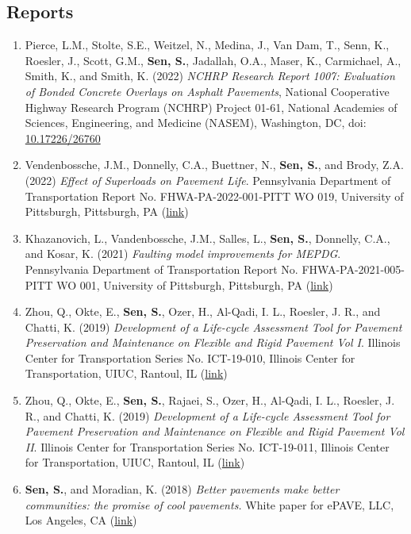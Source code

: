 \documentclass[12pt]{article}
\begin{document}
\subsection*{Reports}
\begin{enumerate}
	\item Pierce, L.M., Stolte, S.E., Weitzel, N., Medina, J., Van Dam, T., Senn, K., Roesler, J., Scott, G.M., \textbf{Sen, S.}, Jadallah, O.A., Maser, K., Carmichael, A., Smith, K., and Smith, K. (2022) \textit{NCHRP Research Report 1007: Evaluation of Bonded Concrete Overlays on Asphalt Pavements}, National Cooperative Highway Research Program (NCHRP) Project 01-61, National Academies of Sciences, Engineering, and Medicine (NASEM), Washington, DC, doi: \href{http://doi.org/10.17226/26760}{10.17226/26760}
	\item Vendenbossche, J.M., Donnelly, C.A., Buettner, N., \textbf{Sen, S.}, and Brody, Z.A. (2022) \textit{Effect of Superloads on Pavement Life}. Pennsylvania Department of Transportation Report No. FHWA-PA-2022-001-PITT WO 019, University of Pittsburgh, Pittsburgh, PA (\href{https://www.penndot.pa.gov/ProjectAndPrograms/Planning/Research-And-Implementation/Documents/Superload\%20Effect\%20on\%20Pavement\%20Life.pdf}{link})
	\item Khazanovich, L., Vandenbossche, J.M., Salles, L., \textbf{Sen, S.}, Donnelly, C.A., and Kosar, K. (2021) \textit{Faulting model improvements for MEPDG}. Pennsylvania Department of Transportation Report No. FHWA-PA-2021-005-PITT WO 001, University of Pittsburgh, Pittsburgh, PA (\href{https://www.penndot.pa.gov/ProjectAndPrograms/Planning/Research-And-Implementation/Documents/Faulting\%20Model\%20Improvements\%20for\%20MEPDG.pdf}{link})
	\item Zhou, Q., Okte, E., \textbf{Sen, S.}, Ozer, H., Al-Qadi, I. L., Roesler, J. R., and Chatti, K. (2019) \textit{Development of a Life-cycle Assessment Tool for Pavement Preservation and Maintenance on Flexible and Rigid Pavement Vol I}. Illinois Center for Transportation Series No. ICT-19-010, Illinois Center for Transportation, UIUC, Rantoul, IL (\href{https://apps.ict.illinois.edu/projects/getfile.asp?id=8865}{link})
	\item Zhou, Q., Okte, E., \textbf{Sen, S.}, Rajaei, S., Ozer, H., Al-Qadi, I. L., Roesler, J. R., and Chatti, K. (2019) \textit{Development of a Life-cycle Assessment Tool for Pavement Preservation and Maintenance on Flexible and Rigid Pavement Vol II}. Illinois Center for Transportation Series No. ICT-19-011, Illinois Center for Transportation, UIUC, Rantoul, IL (\href{https://apps.ict.illinois.edu/projects/getfile.asp?id=8866}{link})
	\item \textbf{Sen, S.}, and Moradian, K. (2018) \textit{Better pavements make better communities: the promise of cool pavements.} White paper for ePAVE, LLC, Los Angeles, CA (\href{http://www.epavellc.com/wp-content/uploads/ePAVE-White-Paper.pdf}{link})
\end{enumerate}
\end{document}
